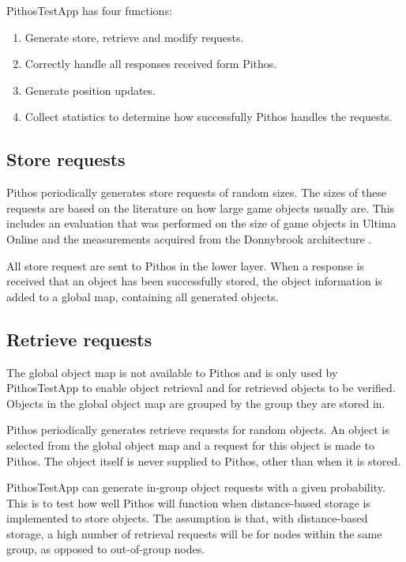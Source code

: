 PithosTestApp has four functions:
\begin{enumerate}
\item Generate store, retrieve and modify requests.
\item Correctly handle all responses received form Pithos.
\item Generate position updates.
\item Collect statistics to determine how successfully Pithos handles the requests.
\end{enumerate}

\subsection{Store requests}

Pithos periodically generates store requests of random sizes. The sizes of these requests are based on the literature on how large game objects usually are. This includes an evaluation that was performed on the size of game objects in Ultima Online and the measurements acquired from the Donnybrook architecture \cite{Bharambe_Donnybrook}.

All store request are sent to Pithos in the lower layer. When a response is received that an object has been successfully stored, the object information is added to a global map, containing all generated objects.

\subsection{Retrieve requests}

The global object map is not available to Pithos and is only used by PithosTestApp to enable object retrieval and for retrieved objects to be verified. Objects in the global object map are grouped by the group they are stored in.

Pithos periodically generates retrieve requests for random objects. An object is selected from the global object map and a request for this object is made to Pithos. The object itself is never supplied to Pithos, other than when it is stored.

PithosTestApp can generate in-group object requests with a given probability. This is to test how well Pithos will function when distance-based storage is implemented to store objects. The assumption is that, with distance-based storage, a high number of retrieval requests will be for nodes within the same group, as opposed to out-of-group nodes.

